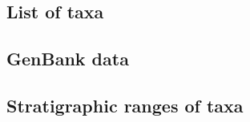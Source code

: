 \documentclass[a4paper, 12pt]{article}
\begin{document}
\newpage
\begin{landscape}
\subsection{List of taxa}

\end{landscape}

\newpage



\newpage
\subsection{GenBank data}



\newpage
\begin{landscape}
\subsection{Stratigraphic ranges of taxa}

\end{landscape}

\newpage
\end{document}
